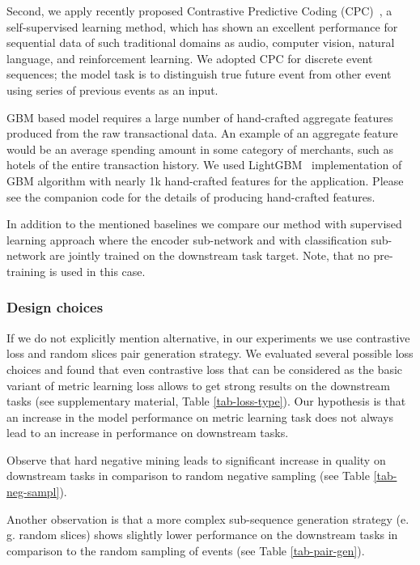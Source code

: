 \documentclass{article}
\begin{document}
Second, we apply recently proposed Contrastive Predictive Coding (CPC)~\cite{Oord2018RepresentationLW}, a self-supervised learning method, which has shown an excellent performance for sequential data of such traditional domains as audio, computer vision, natural language, and reinforcement learning. We adopted CPC for discrete event sequences; the model task is to distinguish true future event from other event using series of previous events as an input.

GBM based model requires a large number of hand-crafted aggregate features produced from the raw transactional data. An example of an aggregate feature would be an average spending amount in some category of merchants, such as hotels of the entire transaction history.
We used LightGBM~\cite{Ke2017LightGBMAH} implementation of GBM algorithm with nearly 1k hand-crafted features for the application. Please see the companion code for the details of producing hand-crafted features.

In addition to the mentioned baselines we compare our method with supervised learning approach where the encoder sub-network and with classification sub-network are jointly trained on the downstream task target. Note, that no pre-training is used in this case.

\subsubsection{Design choices}

If we do not explicitly mention alternative, in our experiments we use contrastive loss and random slices pair generation strategy. We evaluated several possible loss choices and found that even contrastive loss that can be considered as the basic variant of metric learning loss allows to get strong results on the downstream tasks (see supplementary material, Table \ref{tab-loss-type}). Our hypothesis is that an increase in the model performance on metric learning task does not always lead to an increase in performance on downstream tasks.

Observe that hard negative mining leads to significant increase in quality on downstream tasks in comparison to random negative sampling (see Table \ref{tab-neg-sampl}).

Another observation is that a more complex sub-sequence generation strategy (e. g. random slices) shows slightly lower performance on the downstream tasks in comparison to the random sampling of events (see Table \ref{tab-pair-gen}).
\end{document}
